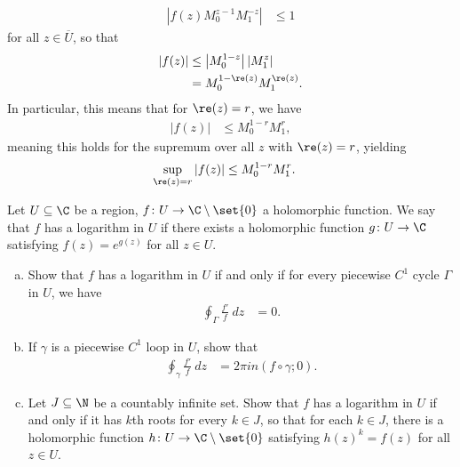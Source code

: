 \documentclass[10pt]{mypackage}
\begin{document}
\begin{solution}
\begin{align*}
    \left\vert f(z)M_0^{z-1}M_1^{-z} \right\vert &\leq 1
  \end{align*}
  for all $z\in \overline{U}$, so that
  \begin{align*}
    \left\vert f(z) \right\vert&\leq \left\vert M_0^{1-z} \right\vert \left\vert M_1^{z} \right\vert\\
                               &= M_0^{1-\re(z)} M_1^{\re(z)}.
  \end{align*}
  In particular, this means that for $\re(z) = r$, we have
  \begin{align*}
    \left\vert f(z) \right\vert &\leq M_0^{1-r}M_1^{r},
  \end{align*}
  meaning this holds for the supremum over all $z$ with $\re(z) = r$, yielding
  \begin{align*}
    \sup_{\re(z) = r} \left\vert f(z) \right\vert &\leq M_0^{1-r}M_1^{r}.
  \end{align*}
\end{solution}
\begin{problem}
  Let $U\subseteq \C$ be a region, $f\colon U\rightarrow \C\setminus \set{0}$ a holomorphic function. We say that $f$ has a logarithm in $U$ if there exists a holomorphic function $g\colon U\rightarrow \C$ satisfying $f(z) = e^{g(z)}$ for all $z\in U$.
  \begin{enumerate}[(a)]
    \item Show that $f$ has a logarithm in $U$ if and only if for every piecewise $C^{1}$ cycle $\Gamma$ in $U$, we have
      \begin{align*}
        \oint_{\Gamma}^{} \frac{f'}{f}\:dz &= 0.
      \end{align*}
    \item If $\gamma$ is a piecewise $C^{1}$ loop in $U$, show that
      \begin{align*}
        \oint_{\gamma}^{} \frac{f'}{f}\:dz &= 2\pi i n\left( f\circ\gamma;0 \right).
      \end{align*}
    \item Let $J\subseteq \N$ be a countably infinite set. Show that $f$ has a logarithm in $U$ if and only if it has $k$th roots for every $k\in J$, so that for each $k\in J$, there is a holomorphic function $h\colon U\rightarrow \C\setminus \set{0}$ satisfying $h(z)^{k} = f(z)$ for all $z\in U$.
  \end{enumerate}
\end{problem}
\end{document}
